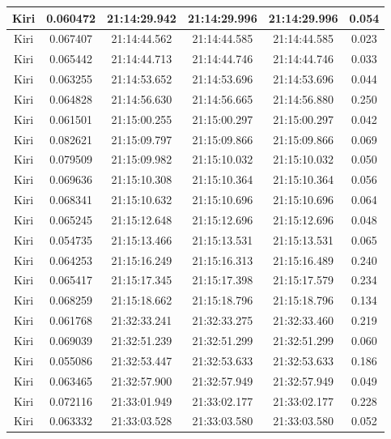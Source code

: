 \begin{longtable}{|c|c|c|c|c|c|}
      Kiri & 0.060472 & 21:14:29.942 & 21:14:29.996 & 21:14:29.996 & 0.054 \\ \hline
      Kiri & 0.067407 & 21:14:44.562 & 21:14:44.585 & 21:14:44.585 & 0.023 \\ \hline
      Kiri & 0.065442 & 21:14:44.713 & 21:14:44.746 & 21:14:44.746 & 0.033 \\ \hline
      Kiri & 0.063255 & 21:14:53.652 & 21:14:53.696 & 21:14:53.696 & 0.044 \\ \hline
      Kiri & 0.064828 & 21:14:56.630 & 21:14:56.665 & 21:14:56.880  & 0.250 \\ \hline
      Kiri & 0.061501 & 21:15:00.255 & 21:15:00.297 & 21:15:00.297 & 0.042 \\ \hline
      Kiri & 0.082621  & 21:15:09.797 & 21:15:09.866 & 21:15:09.866 & 0.069 \\ \hline
      Kiri & 0.079509 & 21:15:09.982 & 21:15:10.032 & 21:15:10.032 & 0.050 \\ \hline
      Kiri & 0.069636 & 21:15:10.308 & 21:15:10.364 & 21:15:10.364 & 0.056 \\ \hline
      Kiri & 0.068341 & 21:15:10.632 & 21:15:10.696 & 21:15:10.696 & 0.064 \\ \hline
      Kiri & 0.065245 & 21:15:12.648 & 21:15:12.696 & 21:15:12.696 & 0.048 \\ \hline
      Kiri & 0.054735 & 21:15:13.466 & 21:15:13.531 & 21:15:13.531 & 0.065 \\ \hline
      Kiri & 0.064253 & 21:15:16.249 & 21:15:16.313 & 21:15:16.489 & 0.240 \\ \hline
      Kiri & 0.065417 & 21:15:17.345 & 21:15:17.398 & 21:15:17.579 & 0.234 \\ \hline
      Kiri & 0.068259 & 21:15:18.662 & 21:15:18.796 & 21:15:18.796 & 0.134 \\ \hline
      Kiri & 0.061768 & 21:32:33.241 & 21:32:33.275 & 21:32:33.460 & 0.219 \\ \hline
      Kiri & 0.069039 & 21:32:51.239 & 21:32:51.299 & 21:32:51.299 & 0.060 \\ \hline
      Kiri & 0.055086 & 21:32:53.447 & 21:32:53.633 & 21:32:53.633 & 0.186 \\ \hline
      Kiri & 0.063465 & 21:32:57.900 & 21:32:57.949 & 21:32:57.949 & 0.049 \\ \hline
      Kiri & 0.072116 & 21:33:01.949 & 21:33:02.177 & 21:33:02.177 & 0.228 \\ \hline
      Kiri & 0.063332 & 21:33:03.528 & 21:33:03.580 & 21:33:03.580 & 0.052 \\ \hline
\end{longtable}

